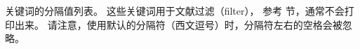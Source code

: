 \begin{fieldlist}



关键词的分隔值列表。
这些关键词用于文献过滤（filter），
参考  节，通常不会打印出来。
请注意，使用默认的分隔符（西文逗号）时，分隔符左右的空格会被忽略。


\end{fieldlist}
